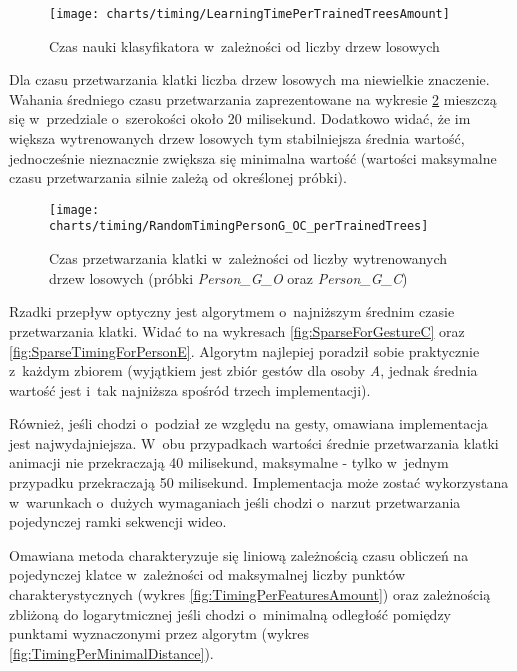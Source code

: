       \begin{figure}[!ht]
        \centering
        \texttt{[image: charts/timing/LearningTimePerTrainedTreesAmount]}
        \caption[Czas nauki klasyfikatora w~zależności od liczby drzew losowych]
                {Czas nauki klasyfikatora w~zależności od liczby drzew losowych}
        \label{fig:LearningTime}
      \end{figure}

    Dla czasu przetwarzania klatki liczba drzew losowych ma niewielkie znaczenie. Wahania średniego czasu przetwarzania zaprezentowane na wykresie \ref{fig:TimingPerTrainedTreesAmount} mieszczą się w~przedziale o~szerokości około 20 milisekund. Dodatkowo widać, że im większa wytrenowanych drzew losowych tym stabilniejsza średnia wartość, jednocześnie nieznacznie zwiększa się minimalna wartość (wartości maksymalne czasu przetwarzania silnie zależą od określonej próbki).

      \begin{figure}[!ht]
        \centering
        \texttt{[image: charts/timing/RandomTimingPersonG\_OC\_perTrainedTrees]}
        \caption[Czas przetwarzania klatki w~zależności od liczby wytrenowanych drzew losowych]
                {Czas przetwarzania klatki w~zależności od liczby wytrenowanych drzew losowych (próbki \textit{Person\_G\_O} oraz \textit{Person\_G\_C})}
        \label{fig:TimingPerTrainedTreesAmount}
      \end{figure}

    \newpage
    Rzadki przepływ optyczny jest algorytmem o~najniższym średnim czasie przetwarzania klatki. Widać to na wykresach \ref{fig:SparseForGestureC} oraz \ref{fig:SparseTimingForPersonE}. Algorytm najlepiej poradził sobie praktycznie z~każdym zbiorem (wyjątkiem jest zbiór gestów dla osoby \textit{A}, jednak średnia wartość jest i~tak najniższa spośród trzech implementacji).

    Również, jeśli chodzi o~podział ze względu na gesty, omawiana implementacja jest najwydajniejsza. W~obu przypadkach wartości średnie przetwarzania klatki animacji nie przekraczają 40 milisekund, maksymalne - tylko w~jednym przypadku przekraczają 50 milisekund. Implementacja może zostać wykorzystana w~warunkach o~dużych wymaganiach jeśli chodzi o~narzut przetwarzania pojedynczej ramki sekwencji wideo.

    Omawiana metoda charakteryzuje się liniową zależnością czasu obliczeń na pojedynczej klatce w~zależności od maksymalnej liczby punktów charakterystycznych (wykres \ref{fig:TimingPerFeaturesAmount}) oraz zależnością zbliżoną do logarytmicznej jeśli chodzi o~minimalną odległość pomiędzy punktami wyznaczonymi przez algorytm (wykres \ref{fig:TimingPerMinimalDistance}).

